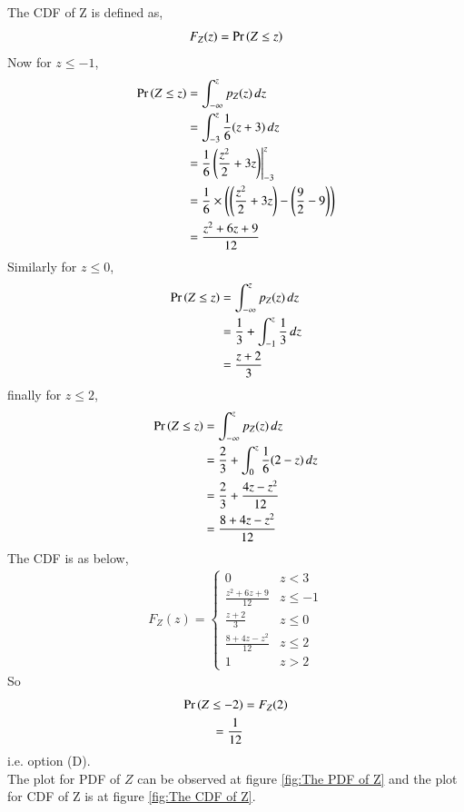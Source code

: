 The CDF of Z is defined as,
\begin{equation}
    F_Z(z) = \Pr\left(Z \le z\right)
\end{equation}
Now for $ z \le -1 $,
\begin{align}
    \Pr\left(Z\le z\right) &=  \int_{-\infty}^{z}p_{Z}(z) \,dz  \\
          &=  \int_{-3}^{z} \dfrac{1}{6}(z+3) \,dz  \\
          &= \dfrac{1}{6} \left(\dfrac{z^2}{2}+3z \right) \Biggr|_{-3}^{z}  \\
          &=  \dfrac{1}{6} \times \left(\left(\dfrac{z^2}{2}+3z \right) - \left(\dfrac{9}{2} -9 \right)\right) \\
          &= \dfrac{z^2+6z + 9}{12} 
\end{align}
Similarly for $z \le 0$,
\begin{align}
    \Pr\left(Z\le z\right) &=  \int_{-\infty}^{z}p_{Z}(z) \,dz  \\
          &=  \dfrac{1}{3} + \int_{-1}^{z} \dfrac{1}{3} \,dz  \\
          &= \dfrac{z+2}{3} 
\end{align}
finally for $z \le 2$,
\begin{align}
    \Pr\left(Z\le z\right) &=  \int_{-\infty}^{z}p_{Z}(z) \,dz  \\
          &= \dfrac{2}{3} + \int_{0}^{z} \dfrac{1}{6}(2-z) \,dz  \\
         & =  \dfrac{2}{3} +\dfrac{4z- z^2}{12} \\
         & = \dfrac{8 +4z -z^2}{12} 
\end{align}
The CDF is as below, 
\begin{align}
\label{eq:cdf_z}
F_{Z}(z)  = 
\begin{cases}
0 & z < 3
\\
\frac{z^2+6z + 9}{12} &  z \le -1
\\
\frac{z+2}{3} &  z \le 0
\\
\frac{8 +4z -z^2}{12} & z \le 2
\\
1 & z > 2
\end{cases}
\end{align}
So 
\begin{align}
    \Pr\left( Z \leq -2\right) &= F_{Z}(2) \\
                  = \dfrac{1}{12}
\end{align}
i.e. option (D). \\
The plot for PDF of $Z $ can be observed at figure \ref{fig:The PDF of Z} and the plot for CDF of Z is at figure \ref{fig:The CDF of Z}.
